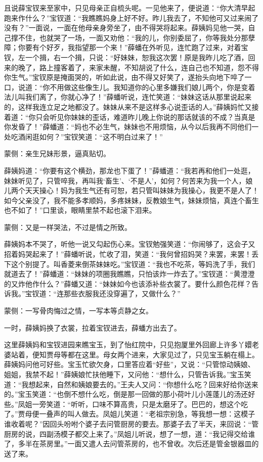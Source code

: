 \begin{parag}
    且说薛宝钗来至家中，只见母亲正自梳头呢。一见他来了，便说道：“你大清早起跑来作什么？”宝钗道：“我瞧瞧妈身上好不好。昨儿我去了，不知他可又过来闹了没有？”一面说，一面在他母亲身旁坐了，由不得哭将起来。薛姨妈见他一哭，自己撑不住，也就哭了一场，一面又劝他：“我的儿，你别委屈了，你等我处分那孽障；你要有个好歹，我指望那一个来！”薛蟠在外听见，连忙跑了过来，对着宝钗，左一个揖，右一个揖，只说：“好妹妹，恕我这次罢！原是我昨儿吃了酒，回来的晚了，路上撞客着了，来家未醒，不知胡说了什么，连自己也不知道，怨不得你生气。”宝钗原是掩面哭的，听如此说，由不得又好笑了，遂抬头向地下啐了一口，说道：“你不用做这些像生儿。我知道你的心里多嫌我们娘儿两个，你是变着法儿叫我们离了，你就心净了！”薛蟠听说，连忙笑道：“妹妹这话从那里说起来的，这样我连立足之地都没了。妹妹从来不是这样多心说歪话的人。”薛姨妈忙又接着道：“你只会听见你妹妹的歪话，难道昨儿晚上你说的那话就该的不成？当真是你发昏了！”薛蟠道：“妈也不必生气，妹妹也不用烦恼，从今以后我再不同他们一处吃酒闲逛如何？”宝钗笑道：“这不明白过来了！”\begin{note}蒙侧：亲生兄妹形景，逼真贴切。\end{note}薛姨妈道：“你要有这个横劲，那龙也下蛋了！”薛蟠道：“我若再和他们一处逛，妹妹听见了，只管啐我，再叫我‘畜生’、‘不是人’，如何？何苦来为我一个人，娘儿两个天天操心！妈为我生气还有可恕，若只管叫妹妹为我操心，我更不是人了！如今父亲没了，我不能多孝顺妈，多疼妹妹，反教娘生气，妹妹烦恼，真连个畜生也不如了！”口里谈，眼睛里禁不起也滚下泪来。\begin{note}蒙侧：又是一样哭法，不过是情之所致。\end{note}薛姨妈本不哭了，听他一说又勾起伤心来。宝钗勉强笑道：“你闹够了，这会子又招着妈哭起来了！”薛蟠听说，忙收了泪，笑道：“我何曾招妈哭？来罢，来罢！丢下这个别提了。叫香菱来倒茶妹妹吃。”宝钗道：“我也不吃茶，等妈洗了手，我们就道去了！”薛蟠道：“妹妹的项圈我瞧瞧，只怕该炸一炸去了。”宝钗道：“黄澄澄的又炸他作什么？”薛蟠又道：“妹妹如今也该添补些衣裳了。要什么颜色花样？告诉我。”宝钗道：“连那些衣服我还没穿遍了，又做什么？”\begin{note}蒙侧：一写骨肉悔过之情，一写本等贞静之女。\end{note}一时，薛姨妈换了衣裳，拉着宝钗进去，薛蟠方出去了。
\end{parag}


\begin{parag}
    这里薛姨妈和宝钗进园来瞧宝玉，到了怡红院中，只见抱厦里外回廊上许多丫嬛老婆站着，便知贾母等都在这里。母女两个进来，大家见过了，只见宝玉躺在榻上。薛姨妈问他可好些。宝玉忙欲欠身，口里答应着“好些”，又说：“只管惊动姨娘、姐姐，我禁不起！”薛姨娘忙扶他睡下，又问他：“想什么，只管告诉我。”宝玉笑道：“我想起来，自然和姨娘要去的。”王夫人又问：“你想什么吃？回来好给你送来的。”宝玉笑道：“也倒不想什么吃，倒是那一回做的那小荷叶儿小莲蓬儿的汤还好些。”凤姐一旁笑道：“听听，口味不算高贵，只是太磨牙了。巴巴的，想这个吃了。”贾母便一叠声的叫人做去。凤姐儿笑道：“老祖宗别急，等我想一想：这模子谁收着呢？”因回头吩咐个婆子去问管厨房的要去。那婆子去了半天，来回说：“管厨房的说，四副汤模子都交上来了。”凤姐儿听说，想了一想，道：“我记得交给谁了，多半在茶房里。”一面又遣人去问管茶房的，也不曾收。次后还是管金银器皿的送了来。
\end{parag}


